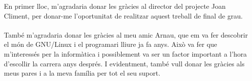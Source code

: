 En primer lloc, m'agradaria donar les gràcies al director del projecte Joan Climent, per donar-me l'oportunitat de realitzar aquest treball de final de grau.\\\\
També m'agradaria donar les gràcies al meu amic Arnau, que em va fer descobrir el món de GNU/Linux i el programari lliure ja fa anys. Això va fer que m'interessés per la informàtica i possiblement va ser un
factor important a l'hora d'escollir la carrera anys després. I evidentment, també vull donar les gràcies als meus pares i a la meva família per tot el seu suport.
